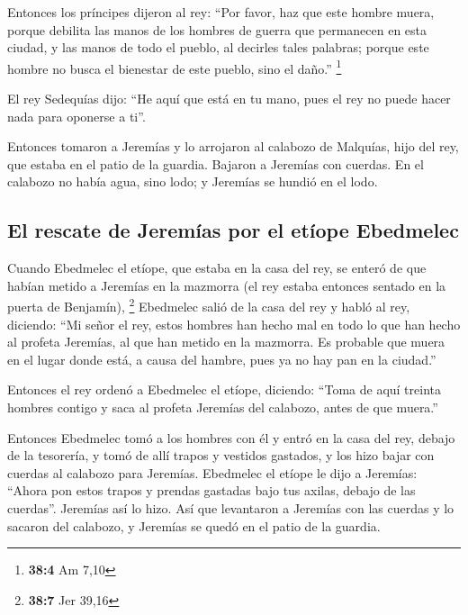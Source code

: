 \begin{paracol}{2}
 Entonces los príncipes dijeron al rey: ``Por favor, haz
que este hombre muera, porque debilita las manos de los hombres de
guerra que permanecen en esta ciudad, y las manos de todo el pueblo, al
decirles tales palabras; porque este hombre no busca el bienestar de
este pueblo, sino el daño.'' \footnote{\textbf{38:4} Am 7,10}

 El rey Sedequías dijo: ``He aquí que está en tu mano,
pues el rey no puede hacer nada para oponerse a ti''.

 Entonces tomaron a Jeremías y lo arrojaron al calabozo de
Malquías, hijo del rey, que estaba en el patio de la guardia. Bajaron a
Jeremías con cuerdas. En el calabozo no había agua, sino lodo; y
Jeremías se hundió en el lodo.

\hypertarget{el-rescate-de-jeremuxedas-por-el-etuxedope-ebedmelec}{%
\subsection{El rescate de Jeremías por el etíope
Ebedmelec}\label{el-rescate-de-jeremuxedas-por-el-etuxedope-ebedmelec}}

 Cuando Ebedmelec el etíope, que estaba en la casa del
rey, se enteró de que habían metido a Jeremías en la mazmorra (el rey
estaba entonces sentado en la puerta de Benjamín), \footnote{\textbf{38:7}
  Jer 39,16}  Ebedmelec salió de la casa del rey y habló
al rey, diciendo:  ``Mi señor el rey, estos hombres han
hecho mal en todo lo que han hecho al profeta Jeremías, al que han
metido en la mazmorra. Es probable que muera en el lugar donde está, a
causa del hambre, pues ya no hay pan en la ciudad.''

 Entonces el rey ordenó a Ebedmelec el etíope, diciendo:
``Toma de aquí treinta hombres contigo y saca al profeta Jeremías del
calabozo, antes de que muera.''

 Entonces Ebedmelec tomó a los hombres con él y entró en
la casa del rey, debajo de la tesorería, y tomó de allí trapos y
vestidos gastados, y los hizo bajar con cuerdas al calabozo para
Jeremías.  Ebedmelec el etíope le dijo a Jeremías:
``Ahora pon estos trapos y prendas gastadas bajo tus axilas, debajo de
las cuerdas''. Jeremías así lo hizo.  Así que levantaron
a Jeremías con las cuerdas y lo sacaron del calabozo, y Jeremías se
quedó en el patio de la guardia.

\hypertarget{el-uxfaltimo-encuentro-secreto-de-jeremuxedas-con-el-rey}{%
}
\end{paracol}
